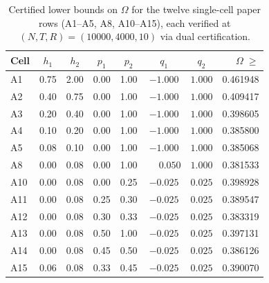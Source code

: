 \documentclass{article}
\begin{document}
\begin{table}[h]
\centering
\caption{Certified lower bounds on $\Omega$ for the twelve single-cell paper rows
(A1--A5, A8, A10--A15), each verified at $(N, T, R) = (10000, 4000, 10)$
via dual certification.}
\label{tab:paper-singletons}
\begin{tabular}{l cc cc cc r}
\toprule
Cell & $h_1$ & $h_2$ & $p_1$ & $p_2$ & $q_1$ & $q_2$ & $\Omega \;\ge$ \\
\midrule
A1  & 0.75 & 2.00 & 0.00 & 1.00 & $-1.000$ & $1.000$ & 0.461948 \\
A2  & 0.40 & 0.75 & 0.00 & 1.00 & $-1.000$ & $1.000$ & 0.409417 \\
A3  & 0.20 & 0.40 & 0.00 & 1.00 & $-1.000$ & $1.000$ & 0.398605 \\
A4  & 0.10 & 0.20 & 0.00 & 1.00 & $-1.000$ & $1.000$ & 0.385800 \\
A5  & 0.08 & 0.10 & 0.00 & 1.00 & $-1.000$ & $1.000$ & 0.385068 \\
A8  & 0.00 & 0.08 & 0.00 & 1.00 & $\phantom{-}0.050$ & $1.000$ & 0.381533 \\
A10 & 0.00 & 0.08 & 0.00 & 0.25 & $-0.025$ & $0.025$ & 0.398928 \\
A11 & 0.00 & 0.08 & 0.25 & 0.30 & $-0.025$ & $0.025$ & 0.389547 \\
A12 & 0.00 & 0.08 & 0.30 & 0.33 & $-0.025$ & $0.025$ & 0.383319 \\
A13 & 0.00 & 0.08 & 0.50 & 1.00 & $-0.025$ & $0.025$ & 0.397131 \\
A14 & 0.00 & 0.08 & 0.45 & 0.50 & $-0.025$ & $0.025$ & 0.386126 \\
A15 & 0.06 & 0.08 & 0.33 & 0.45 & $-0.025$ & $0.025$ & 0.390070 \\
\bottomrule
\end{tabular}
\end{table}
\end{document}
